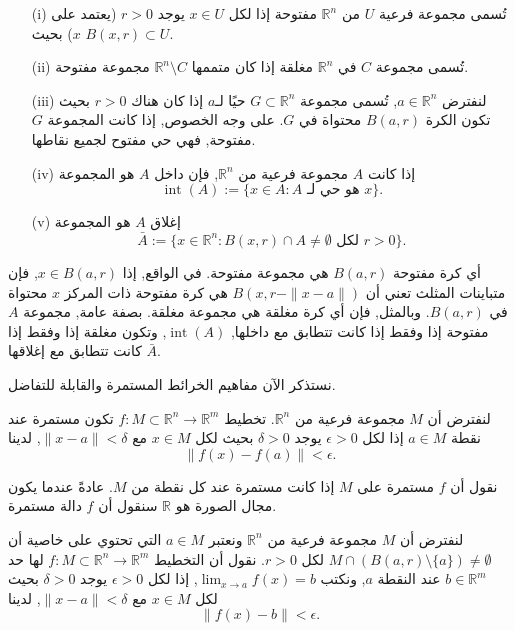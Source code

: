 \begin{definition}
\begin{itemize}
    \item [(i)] تُسمى مجموعة فرعية \(U\) من \(\mathbb{R}^n\) مفتوحة إذا لكل \(x \in U\) يوجد \(r > 0\) (يعتمد على \(x\)) بحيث \(B(x, r) \subset U\).
    \item [(ii)] تُسمى مجموعة \(C\) في \(\mathbb{R}^n\) مغلقة إذا كان متممها \(\mathbb{R}^n \setminus C\) مجموعة مفتوحة.
    \item [(iii)] لنفترض \(a \in \mathbb{R}^n\), تُسمى مجموعة \(G \subset \mathbb{R}^n\) حيًا لـ\(a\) إذا كان هناك \(r > 0\) بحيث تكون الكرة \(B(a, r)\) محتواة في \(G\). على وجه الخصوص, إذا كانت المجموعة \(G\) مفتوحة, فهي حي مفتوح لجميع نقاطها.
    \item[(iv)] إذا كانت \(A\) مجموعة فرعية من \(\mathbb{R}^n\), فإن داخل \(A\) هو المجموعة
    \[ 
    \operatorname{int}(A) := \{x \in A : A \text{ هو حي لـ } x\}.
    \]
    \item [(v)] إغلاق \(A\) هو المجموعة
    \[ 
    \bar{A} := \{x \in \mathbb{R}^n : B(x, r) \cap A \neq \emptyset \text{ لكل } r > 0\}. \]
\end{itemize}
\end{definition}

أي كرة مفتوحة \(B(a, r)\) هي مجموعة مفتوحة. في الواقع, إذا \(x \in B(a, r)\), فإن متباينات المثلث تعني أن \(B(x, r - \|x - a\|)\) هي كرة مفتوحة ذات المركز \(x\) محتواة في \(B(a, r)\). وبالمثل, فإن أي كرة مغلقة هي مجموعة مغلقة. بصفة عامة, مجموعة \(A\) مفتوحة إذا وفقط إذا كانت تتطابق مع داخلها, \(\operatorname{int}(A)\), وتكون مغلقة إذا وفقط إذا كانت تتطابق مع إغلاقها \(\bar{A}\).

نستذكر الآن مفاهيم الخرائط المستمرة والقابلة للتفاضل.

\begin{definition}
    
لنفترض أن \(M\) مجموعة فرعية من \(\mathbb{R}^n\). تخطيط \(f : M \subset \mathbb{R}^n \to \mathbb{R}^m\) تكون مستمرة عند نقطة \(a \in M\) إذا لكل \(\epsilon > 0\) يوجد \(\delta > 0\) بحيث لكل \(x \in M\) مع \(\|x - a\| < \delta\), لدينا
\[ \|f(x) - f(a)\| < \epsilon. \]
\end{definition}

نقول أن \(f\) مستمرة على \(M\) إذا كانت مستمرة عند كل نقطة من \(M\). عادةً عندما يكون مجال الصورة هو \(\mathbb{R}\) سنقول أن \(f\) دالة مستمرة.

\begin{definition}
لنفترض أن \(M\) مجموعة فرعية من \(\mathbb{R}^n\) ونعتبر \(a \in M\) التي تحتوي على خاصية أن \(M \cap (B(a, r) \setminus \{a\}) \neq \emptyset\) لكل \(r > 0\). نقول أن التخطيط \(f : M \subset \mathbb{R}^n \to \mathbb{R}^m\) لها حد \(b \in \mathbb{R}^m\) عند النقطة \(a\), ونكتب \(\lim_{x \to a} f(x) = b\), إذا لكل \(\epsilon > 0\) يوجد \(\delta > 0\) بحيث لكل \(x \in M\) مع \(\|x - a\| < \delta\), لدينا
\[ \|f(x) - b\| < \epsilon. \]
\end{definition}


